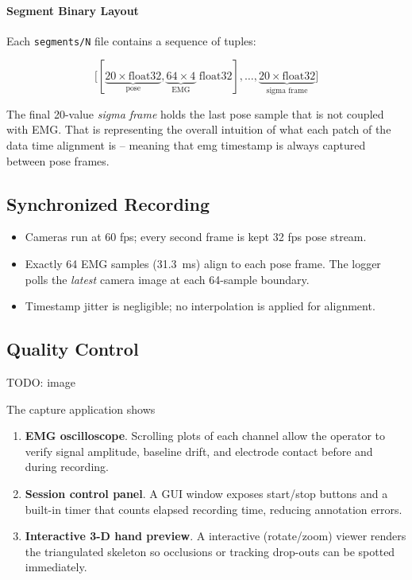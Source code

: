 \paragraph{Segment Binary Layout}

Each \texttt{segments/N} file contains a sequence of tuples:

\[
\bigl[
  [\underbrace{20\! \times\! \text{float32}}_{\text{pose}},
   \underbrace{64\!\times\!4}_{\text{EMG}}\text{ float32}],
  \dots,
  \underbrace{20\! \times\! \text{float32}}_{\text{sigma frame}}
\bigr]
\]

The final 20-value \emph{sigma frame} holds the last pose sample that is not coupled with EMG. That is representing the overall intuition of what each patch of the data time alignment is -- meaning that emg timestamp is always captured between pose frames.

\subsection{Synchronized Recording}

\begin{itemize}
  \item Cameras run at 60 fps; every second frame is kept 32 fps pose stream.
  \item Exactly 64 EMG samples (\SI{31.3}{ms}) align to each pose frame. The
        logger polls the \emph{latest} camera image at each 64-sample boundary.
  \item Timestamp jitter is negligible; no interpolation is
        applied for alignment.
\end{itemize}

\subsection{Quality Control}

TODO: image

The capture application shows

\begin{enumerate}[label=\alph*]
    \item \textbf{EMG oscilloscope}.
          Scrolling plots of each channel allow the operator to verify signal amplitude, baseline drift, and electrode contact before and during recording.
    \item \textbf{Session control panel}.
          A GUI window exposes start/stop buttons and a built-in timer that counts elapsed recording time, reducing annotation errors.
    \item \textbf{Interactive 3-D hand preview}.
          A interactive (rotate/zoom) viewer renders the triangulated skeleton so occlusions or tracking drop-outs can be spotted immediately.
\end{enumerate}

